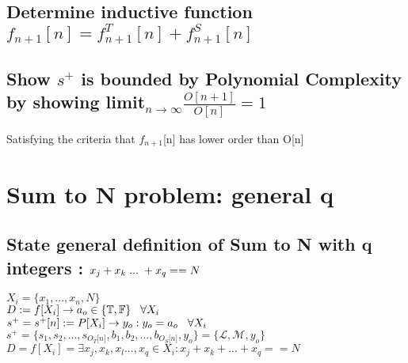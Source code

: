 \documentclass[11pt]{article}
\begin{document}
\subsection{Determine inductive function $f_{n+1}[n] =  f^T_{n+1}[n] +  f^S_{n+1}[n]$}
\begin{center}

\end{center}

\subsection{Show $s^+$ is bounded by Polynomial Complexity by showing limit$_{n \rightarrow \infty}\frac{O[n+1]}{O[n]} = 1$}
Satisfying the criteria that $f_{n+1}$[n] has lower order than O[n] 
\begin{center}

\end{center}





\section{Sum to N problem: general q}
\subsection{State general definition of Sum to N with q integers : $x_j + x_k \hspace{1mm} ... \hspace{1mm} + x_q == N$}
\begin{center}
$
X_i = \{x_1,...,x_n,N\}
$
\\ \vspace{2mm}
$
D := f \lbrack X_i \rbrack \rightarrow a_{o} \in \{\mathbb{T}, \mathbb{F}\} \hspace{3mm} \forall X_i
$
\\ \vspace{2mm}
$
s^+ = s^+\lbrack n \rbrack := P \lbrack X_i \rbrack \rightarrow y_{o} : y_o = a_{o} \hspace{3mm} \forall X_i
$
\\ \vspace{2mm}
$
s^+ = \{ s_1,s_2,...,s_{O_T \lbrack n \rbrack }, b_1, b_2,...,b_{O_S \lbrack n \rbrack},y_o \} = \{ \mathcal{L},\mathcal{M},y_o\}
$
\\ \vspace{6mm}
$
D = f[X_i] = \exists x_j,x_k,x_l...,x_q \in X_i : x_j + x_k + ... + x_q == N
$
\end{center}
\end{document}
